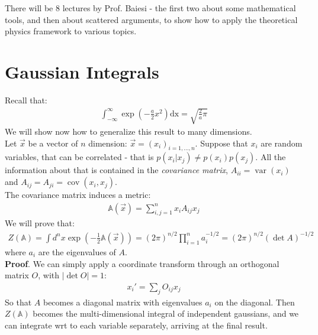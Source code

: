 \documentclass[../template.tex]{subfiles}
\begin{document}
There will be 8 lectures by Prof. Baiesi - the first two about some mathematical tools, and then about scattered arguments, to show how to apply the theoretical physics framework to various topics.\\

\section{Gaussian Integrals}
Recall that:
\begin{align*}
    \int_{-\infty}^{\infty} \exp\left(-\frac{a}{2}x^2 \right) \mathrm{dx} = \sqrt{\frac{2}{a} \pi } 
\end{align*}
We will show now how to generalize this result to many dimensions.\\
Let $\vec{x}$ be a vector of $n$ dimension: $\vec{x} = (x_i)_{i=1,\dots, n}$. Suppose that $x_i$ are random variables, that can be correlated - that is $p(x_i | x_j) \neq p(x_i) p(x_j)$. All the information about that is contained in the \textit{covariance matrix}, $A_{i i} = \operatorname{var} (x_i)$ and $A_{ij} = A_{ji} = \operatorname{cov}(x_i, x_j)$. \\
The covariance matrix induces a metric:
\begin{align*}
    \mathbb{A}(\vec{x}) = \sum_{i,j=1}^{n} x_i A_{ij} x_j
\end{align*}
We will prove that:
\begin{align*}
    Z(\mathbb{A}) = \int d^n x \exp\left(-\frac{1}{2} \mathbb{A}(\vec{x}) \right) = (2\pi)^{n/2} \prod_{i=1}^n a_i^{-1/2} = (2\pi)^{n/2} (\operatorname{det} A)^{-1/2}
\end{align*}
where $a_i$ are the eigenvalues of $A$.\\

\textbf{Proof}. We can simply apply a coordinate transform through an orthogonal matrix $O$, with $|\operatorname{det}O|=1$:
\begin{align*}
    x_i' = \sum_j O_{ij}x_j
\end{align*}    
So that $A$ becomes a diagonal matrix with eigenvalues $a_i$ on the diagonal. Then $Z(\mathbb{A})$ becomes the multi-dimensional integral of independent gaussians, and we can integrate wrt to each variable separately, arriving at the final result.\\
\end{document}
